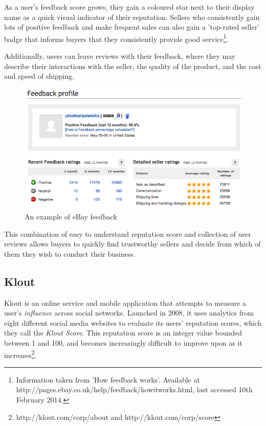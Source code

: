 \documentclass[]{final_report}
\begin{document}
As a user's feedback score grows, they gain a coloured star next to their display name as a quick visual indicator of their reputation. Sellers who consistently gain lots of positive feedback and make frequent sales can also gain a 'top-rated seller' badge that informs buyers that they consistently provide good service\footnote{Information taken from 'How feedback works'. Available at http://pages.ebay.co.uk/help/feedback/howitworks.html, last accessed 10th February 2014.}.

Additionally, users can leave reviews with their feedback, where they may describe their interactions with the seller, the quality of the product, and the cost and speed of shipping.

\begin{figure}[ht!]
\centering
\includegraphics[width=140mm]{ebayfeedback.png}
\caption{An example of eBay feedback}
\end{figure}

This combination of easy to understand reputation score and collection of user reviews allows buyers to quickly find trustworthy sellers and decide from which of them they wish to conduct their business.

\subsection{Klout}

Klout is an online service and mobile application that attempts to measure a user's \textsl{influence} across social networks. Launched in 2008, it uses analytics from eight different social media websites to evaluate its users' reputation scores, which they call the \textsl{Klout Score}. This reputation score is an integer value bounded between 1 and 100, and becomes increasingly difficult to improve upon as it increases\footnote{http://klout.com/corp/about and http://klout.com/corp/score}.
\end{document}
